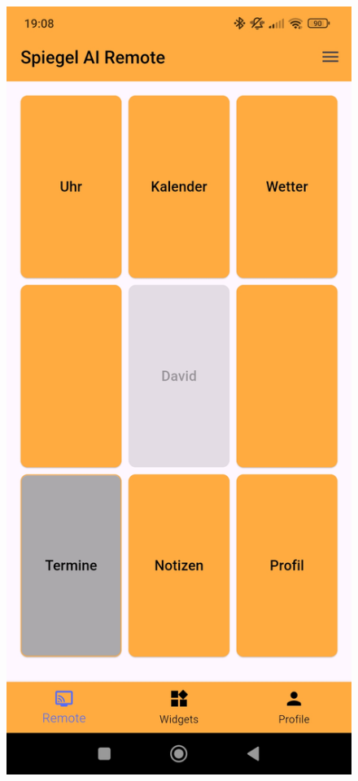 \begin{figure}[h]
    \centering
    \begin{minipage}[b]{0.25\textwidth}
        \centering
        \includegraphics[width=\textwidth]{pictures/remote_remote.jpg}

\end{minipage}
\end{figure}
